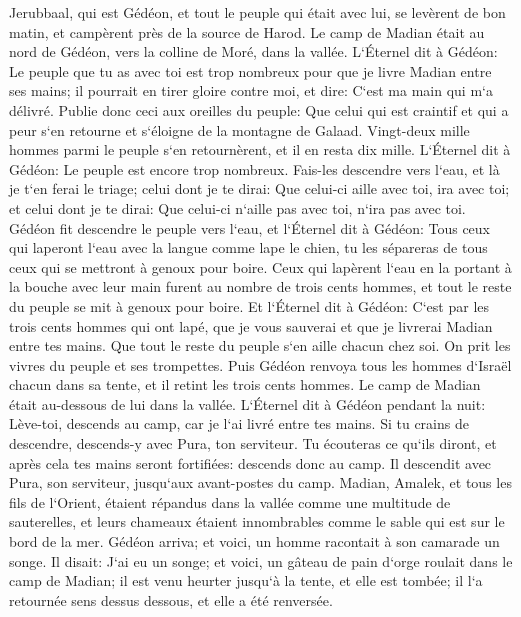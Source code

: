\verse Jerubbaal, qui est Gédéon, et tout le peuple qui était avec lui, se levèrent de bon matin, et campèrent près de la source de Harod. Le camp de Madian était au nord de Gédéon, vers la colline de Moré, dans la vallée. 
\verse L`Éternel dit à Gédéon: Le peuple que tu as avec toi est trop nombreux pour que je livre Madian entre ses mains; il pourrait en tirer gloire contre moi, et dire: C`est ma main qui m`a délivré. 
\verse Publie donc ceci aux oreilles du peuple: Que celui qui est craintif et qui a peur s`en retourne et s`éloigne de la montagne de Galaad. Vingt-deux mille hommes parmi le peuple s`en retournèrent, et il en resta dix mille. 
\verse L`Éternel dit à Gédéon: Le peuple est encore trop nombreux. Fais-les descendre vers l`eau, et là je t`en ferai le triage; celui dont je te dirai: Que celui-ci aille avec toi, ira avec toi; et celui dont je te dirai: Que celui-ci n`aille pas avec toi, n`ira pas avec toi. 
\verse Gédéon fit descendre le peuple vers l`eau, et l`Éternel dit à Gédéon: Tous ceux qui laperont l`eau avec la langue comme lape le chien, tu les sépareras de tous ceux qui se mettront à genoux pour boire. 
\verse Ceux qui lapèrent l`eau en la portant à la bouche avec leur main furent au nombre de trois cents hommes, et tout le reste du peuple se mit à genoux pour boire. 
\verse Et l`Éternel dit à Gédéon: C`est par les trois cents hommes qui ont lapé, que je vous sauverai et que je livrerai Madian entre tes mains. Que tout le reste du peuple s`en aille chacun chez soi. 
\verse On prit les vivres du peuple et ses trompettes. Puis Gédéon renvoya tous les hommes d`Israël chacun dans sa tente, et il retint les trois cents hommes. Le camp de Madian était au-dessous de lui dans la vallée. 
\verse L`Éternel dit à Gédéon pendant la nuit: Lève-toi, descends au camp, car je l`ai livré entre tes mains. 
\verse Si tu crains de descendre, descends-y avec Pura, ton serviteur. 
\verse Tu écouteras ce qu`ils diront, et après cela tes mains seront fortifiées: descends donc au camp. Il descendit avec Pura, son serviteur, jusqu`aux avant-postes du camp. 
\verse Madian, Amalek, et tous les fils de l`Orient, étaient répandus dans la vallée comme une multitude de sauterelles, et leurs chameaux étaient innombrables comme le sable qui est sur le bord de la mer. 
\verse Gédéon arriva; et voici, un homme racontait à son camarade un songe. Il disait: J`ai eu un songe; et voici, un gâteau de pain d`orge roulait dans le camp de Madian; il est venu heurter jusqu`à la tente, et elle est tombée; il l`a retournée sens dessus dessous, et elle a été renversée. 
